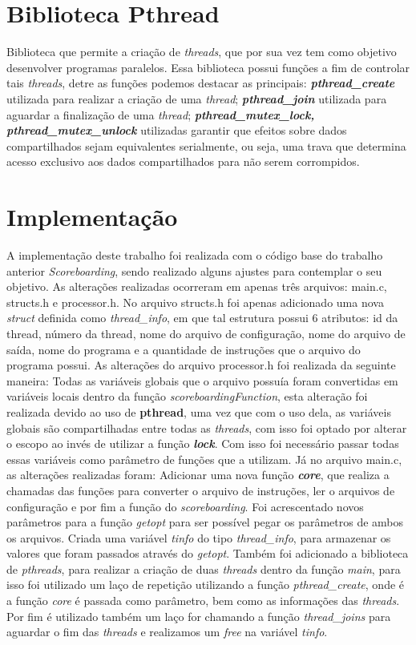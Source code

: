 \documentclass[journal]{IEEEtran}
\begin{document}
\section{Biblioteca Pthread}
Biblioteca que permite a criação de \textit{threads}, que por sua vez tem como objetivo desenvolver programas paralelos. Essa biblioteca possui funções a fim de controlar tais \textit{threads}, detre as funções podemos destacar as principais: \textit{\textbf{pthread\_create}} utilizada para realizar a criação de uma \textit{thread}; \textit{\textbf{pthread\_join}} utilizada para aguardar a finalização de uma \textit{thread}; \textbf{\textit{pthread\_mutex\_lock, pthread\_mutex\_unlock}} utilizadas garantir que efeitos sobre dados compartilhados sejam equivalentes serialmente, ou seja, uma trava que determina acesso exclusivo aos dados compartilhados para não serem corrompidos.

\section{Implementação}

A implementação deste trabalho foi realizada com o código base do trabalho anterior \textit{Scoreboarding}, sendo realizado alguns ajustes para contemplar o seu objetivo. As alterações realizadas ocorreram em apenas três arquivos: main.c, structs.h e processor.h. No arquivo structs.h foi apenas adicionado uma nova \textit{struct} definida como \textit{thread\_info}, em que tal estrutura possui 6 atributos: id da thread, número da thread, nome do arquivo de configuração, nome do arquivo de saída, nome do programa e a quantidade de instruções que o arquivo do programa possui. As alterações do arquivo processor.h foi realizada da seguinte maneira: Todas as variáveis globais que o arquivo possuía foram convertidas em variáveis locais dentro da função \textit{scoreboardingFunction}, esta alteração foi realizada devido ao uso de \textbf{pthread}, uma vez que com o uso dela, as variáveis globais são compartilhadas entre todas as \textit{threads}, com isso foi optado por alterar o escopo ao invés de utilizar a função \textbf{\textit{lock}}. Com isso foi necessário passar todas essas variáveis como parâmetro de funções que a utilizam. Já no arquivo main.c, as alterações realizadas foram: Adicionar uma nova função \textit{\textbf{core}}, que realiza a chamadas das funções para converter o arquivo de instruções, ler o arquivos de configuração e por fim a função do \textit{scoreboarding}. Foi acrescentado novos parâmetros para a função \textit{getopt} para ser possível pegar os parâmetros de ambos os arquivos. Criada uma variável \textit{tinfo} do tipo \textit{thread\_info}, para armazenar os valores que foram passados através do \textit{getopt}. Também foi adicionado a biblioteca de \textit{pthreads}, para realizar a criação de duas \textit{threads} dentro da função \textit{main}, para isso foi utilizado um laço de repetição utilizando a função \textit{pthread\_create}, onde é a função \textit{core} é passada como parâmetro, bem como as informações das \textit{threads}. Por fim é utilizado também um laço for chamando a função \textit{thread\_joins} para aguardar o fim das \textit{threads} e realizamos um \textit{free} na variável \textit{tinfo}.
\end{document}
